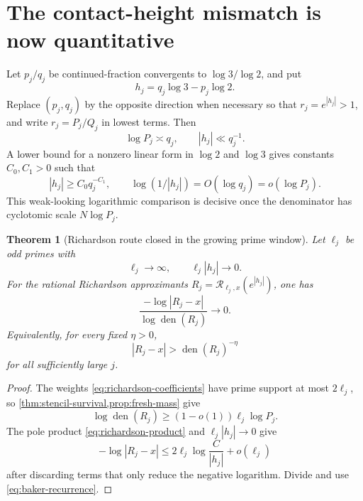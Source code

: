 \documentclass[11pt]{article}
\newtheorem{theorem}{Theorem}[section]
\theoremstyle{definition}
\newcommand{\den}{\operatorname{den}}
\begin{document}
\section{The contact-height mismatch is now quantitative}
\label{sec:no-go}

Let $p_j/q_j$ be continued-fraction convergents to
$\log3/\log2$, and put
\begin{equation}
 h_j=q_j\log3-p_j\log2.
 \label{eq:convergent-h}
\end{equation}
Replace $(p_j,q_j)$ by the opposite direction when necessary so that
$r_j=e^{|h_j|}>1$, and write $r_j=P_j/Q_j$ in lowest terms.  Then
\begin{equation}
 \log P_j\asymp q_j,
 \qquad
 |h_j|\ll q_j^{-1}.
 \label{eq:convergent-upper}
\end{equation}
A lower bound for a nonzero linear form in $\log2$ and $\log3$ gives constants
$C_0,C_1>0$ such that
\begin{equation}
 |h_j|\ge C_0q_j^{-C_1},
 \qquad
 \log(1/|h_j|)=O(\log q_j)=o(\log P_j).
 \label{eq:baker-recurrence}
\end{equation}
This weak-looking logarithmic comparison is decisive once the denominator
has cyclotomic scale $N\log P_j$.

\begin{theorem}[Richardson route closed in the growing prime window]
\label{thm:richardson-no-go}
Let $\ell_j$ be odd primes with
\begin{equation}
 \ell_j\to\infty,
 \qquad
 \ell_j|h_j|\to0.
 \label{eq:prime-window}
\end{equation}
For the rational Richardson approximants
$R_j=\mathcal R_{\ell_j,x}(e^{|h_j|})$, one has
\begin{equation}
 \boxed{
 \frac{-\log|R_j-x|}{\log\den(R_j)}\longrightarrow0.
 }
 \label{eq:richardson-no-go}
\end{equation}
Equivalently, for every fixed $\eta>0$,
\begin{equation}
 |R_j-x|>\den(R_j)^{-\eta}
 \label{eq:weak-approximants}
\end{equation}
for all sufficiently large $j$.
\end{theorem}

\begin{proof}
The weights \eqref{eq:richardson-coefficients} have prime support at most
$2\ell_j$, so \cref{thm:stencil-survival,prop:fresh-mass} give
\[
 \log\den(R_j)\ge(1-o(1))\ell_j\log P_j.
\]
The pole product \eqref{eq:richardson-product} and
$\ell_j|h_j|\to0$ give
\[
 -\log|R_j-x|
 \le 2\ell_j\log\frac{C}{|h_j|}+o(\ell_j)
\]
after discarding terms that only reduce the negative logarithm.  Divide and
use \eqref{eq:baker-recurrence}.
\end{proof}
\end{document}
